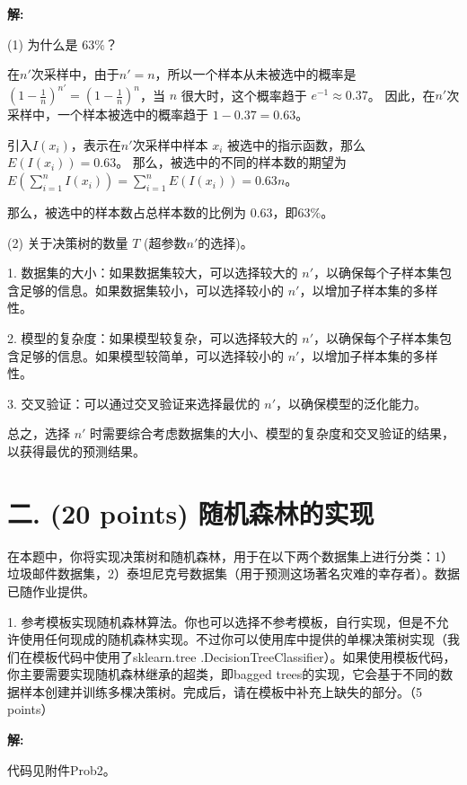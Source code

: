\documentclass[8pt]{article}
\begin{document}
\textbf{\large 解:}

(1) 为什么是 $63\%$？

在$n'$次采样中，由于$n' = n$，所以一个样本从未被选中的概率是 $(1 - \frac{1}{n})^{n'} = (1 - \frac{1}{n})^{n}$，当 $n$ 很大时，这个概率趋于 $e^{-1} \approx 0.37$。
因此，在$n'$次采样中，一个样本被选中的概率趋于 $1 - 0.37 = 0.63$。

引入$I(x_i)$，表示在$n'$次采样中样本 $x_i$ 被选中的指示函数，那么 $E(I(x_i)) = 0.63$。
那么，被选中的不同的样本数的期望为$
E\left(\sum_{i=1}^{n}I(x_i)\right) 
= \sum_{i=1}^{n}E(I(x_i)) = 0.63n$。

那么，被选中的样本数占总样本数的比例为 $0.63$，即$63\%$。

(2) 关于决策树的数量 $T$ (超参数$n'$的选择)。

1. 数据集的大小：如果数据集较大，可以选择较大的 $n'$，以确保每个子样本集包含足够的信息。如果数据集较小，可以选择较小的 $n'$，以增加子样本集的多样性。

2. 模型的复杂度：如果模型较复杂，可以选择较大的 $n'$，以确保每个子样本集包含足够的信息。如果模型较简单，可以选择较小的 $n'$，以增加子样本集的多样性。

3. 交叉验证：可以通过交叉验证来选择最优的 $n'$，以确保模型的泛化能力。

总之，选择 $n'$ 时需要综合考虑数据集的大小、模型的复杂度和交叉验证的结果，以获得最优的预测结果。

\vspace{3em}


\section*{二. (20 points) 随机森林的实现}

在本题中，你将实现决策树和随机森林，用于在以下两个数据集上进行分类：1）垃圾邮件数据集，2）泰坦尼克号数据集（用于预测这场著名灾难的幸存者）。数据已随作业提供。

1. 参考模板实现随机森林算法。你也可以选择不参考模板，自行实现，但是不允许使用任何现成的随机森林实现。不过你可以使用库中提供的单棵决策树实现（我们在模板代码中使用了sklearn.tree .DecisionTreeClassifier）。如果使用模板代码，你主要需要实现随机森林继承的超类，即bagged trees的实现，它会基于不同的数据样本创建并训练多棵决策树。完成后，请在模板中补充上缺失的部分。（5 points）

\textbf{\large 解:}

{\color{blue} 代码见附件Prob2。}

\vspace{3em}
\end{document}
